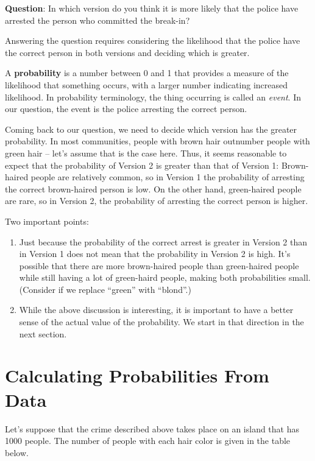 \documentclass[
]{book}
\begin{document}
\textbf{Question}: In which version do you think it is more likely that the police have arrested the person who committed the break-in?

Answering the question requires considering the likelihood that the police have the correct person in both versions and deciding which is greater.

A \textbf{probability} is a number between 0 and 1 that provides a measure of the likelihood that something occurs,
with a larger number indicating increased likelihood. In probability terminology, the thing occurring is called an \emph{event}.
In our question, the event is the police arresting the correct person.

Coming back to our question, we need to decide which version has the greater probability. In most communities,
people with brown hair outnumber people with green hair -- let's assume that is the case here.
Thus, it seems reasonable to expect that the probability of Version 2 is greater than that of Version 1:
Brown-haired people are relatively common, so in Version 1 the probability of arresting the correct brown-haired person is low.
On the other hand, green-haired people are rare, so in Version 2, the probability of arresting the correct person is higher.

Two important points:

\begin{enumerate}
\def\labelenumi{\arabic{enumi})}
\item
  Just because the probability of the correct arrest is greater in Version 2 than in Version 1 does not mean that the probability in Version 2 is high.
  It's possible that there are more brown-haired people than green-haired people while still having a lot of green-haird people,
  making both probabilities small. (Consider if we replace ``green'' with ``blond''.)
\item
  While the above discussion is interesting, it is important to have a better sense of the actual value of the probability.
  We start in that direction in the next section.
\end{enumerate}

\hypertarget{calculating-probabilities-from-data}{%
\section{Calculating Probabilities From Data}\label{calculating-probabilities-from-data}}

Let's suppose that the crime described above takes place on an island that has 1000 people.
The number of people with each hair color is given in the table below.
\end{document}

